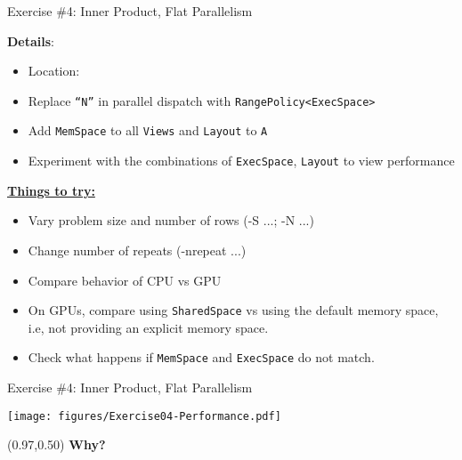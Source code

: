 \begin{frame}[fragile]{Exercise \#4: Inner Product, Flat Parallelism}

  \textbf{Details}:
  \begin{small}
  \begin{itemize}
\item Location: 
\item Replace \texttt{``N''} in parallel dispatch with \texttt{RangePolicy<ExecSpace>}
\item Add \texttt{MemSpace} to all \texttt{Views} and \texttt{Layout} to \texttt{A}
\item Experiment with the combinations of \texttt{ExecSpace}, \texttt{Layout} to view performance
\end{itemize}
  \end{small}


\ul{\textbf{Things to try:}}
  \begin{small}
  \begin{itemize}
  \item Vary problem size and number of rows (-S ...; -N ...)
  \item Change number of repeats (-nrepeat ...)
  \item Compare behavior of CPU vs GPU
  \item On GPUs, compare using \texttt{SharedSpace} vs using the default memory space, i.e, not providing an explicit memory space.
  \item Check what happens if \texttt{MemSpace} and \texttt{ExecSpace} do not match.
  \end{itemize}
  \end{small}
\end{frame}


\begin{frame}[fragile]{Exercise \#4: Inner Product, Flat Parallelism}


  \vspace{-10pt}

    \texttt{[image: figures/Exercise04-Performance.pdf]}

  \vspace{-15pt}

  \begin{textblock*}{0.5\textwidth}(0.97\textwidth,0.50\textheight)
    \textbf{\LARGE Why?}
  \end{textblock*}

\end{frame}

